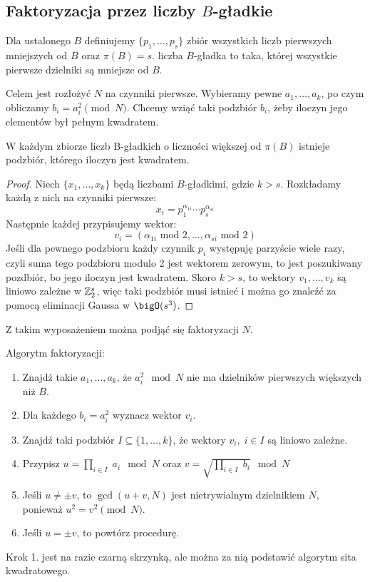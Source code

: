 \subsection{Faktoryzacja przez liczby \( B \)-gładkie}
Dla ustalonego \( B \) definiujemy \( \{p_1, \dots, p_s\} \) zbiór wszystkich liczb pierwszych mniejszych od \( B \) oraz \(\pi(B) = s \). liczba \( B \)-gładka to taka, której wszystkie pierwsze dzielniki są mniejsze od \( B \).
    
Celem jest rozłożyć \( N \) na czynniki pierwsze. Wybieramy pewne \( a_1, \dots, a_k \), po czym obliczamy \( b_i = a_i^2 \pmod{N} \). Chcemy wziąć taki podzbiór \(b_i \), żeby iloczyn jego elementów był pełnym kwadratem.

\begin{lemma}
    W każdym zbiorze liczb B-gładkich o liczności większej od \( \pi(B) \) istnieje podzbiór, którego iloczyn jest kwadratem.
\end{lemma}
\begin{proof}
    Niech \( \{x_1, \dots, x_k\} \) będą liczbami \( B \)-gładkimi, gdzie \( k > s \). Rozkładamy każdą z nich na czynniki pierwsze:
    \[
        x_i = p_1^{\alpha_{1i}} \cdots p_s^{\alpha_{si}}
    \]
    Następnie każdej przypisujemy wektor:
    \[
        v_i = (\alpha_{1i} \text{ mod } 2, \dots, \alpha_{si} \text{ mod } 2)
    \]
    Jeśli dla pewnego podzbioru każdy czynnik \( p_i \) występuję parzyście wiele razy, czyli suma tego podzbioru modulo 2 jest wektorem zerowym, to jest poszukiwany pozdbiór, bo jego iloczyn jest kwadratem. Skoro \( k > s \), to wektory \( v_1, \dots, v_k \) są liniowo zależne w \( \mathbb{Z}_2^s \), więc taki podzbiór musi istnieć i można go znaleźć za pomocą eliminacji Gaussa w \( \bigO(s^3) \).
\end{proof}
Z takim wyposażeniem można podjąć się faktoryzacji \( N \).
\begin{greyframe}
    Algorytm faktoryzacji:
    \begin{enumerate}
        \item Znajdź takie \( a_1, \dots, a_k \), że \( a_i^2 \mod N \) nie ma dzielników pierwszych większych \\ niż \( B \).
        \item Dla każdego \( b_i = a_i^2 \) wyznacz wektor \( v_i \).
        \item Znajdź taki podzbiór \( I \subseteq \{1, \dots, k\} \), że wektory \( v_i,\; i \in I \) są liniowo zależne.
        \item Przypisz \( u = \prod_{i \in I}\; a_i \mod N \) oraz \( v = \sqrt{\prod_{i \in I}\; b_i} \mod N \)
        \item Jeśli \( u \neq \pm v \), to \( \gcd(u + v, N) \) jest nietrywialnym dzielnikiem \( N \), \\ ponieważ \( u^2 = v^2 \pmod{N} \).
        \item Jeśli \( u = \pm v \), to powtórz procedurę.
    \end{enumerate}
\end{greyframe}
Krok 1. jest na razie czarną skrzynką, ale można za nią podstawić algorytm sita kwadratowego.

